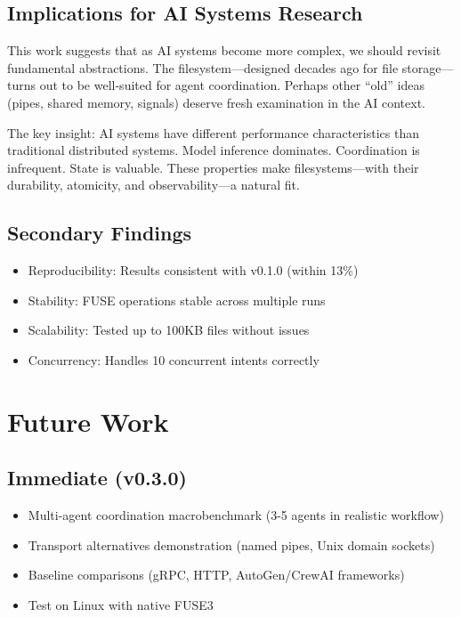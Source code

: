 \documentclass[11pt]{article}
\begin{document}
\subsection{Implications for AI Systems Research}

This work suggests that as AI systems become more complex, we should revisit fundamental abstractions. The filesystem---designed decades ago for file storage---turns out to be well-suited for agent coordination. Perhaps other ``old'' ideas (pipes, shared memory, signals) deserve fresh examination in the AI context.

The key insight: AI systems have different performance characteristics than traditional distributed systems. Model inference dominates. Coordination is infrequent. State is valuable. These properties make filesystems---with their durability, atomicity, and observability---a natural fit.

\subsection{Secondary Findings}

\begin{itemize}
\item Reproducibility: Results consistent with v0.1.0 (within 13\%)
\item Stability: FUSE operations stable across multiple runs
\item Scalability: Tested up to 100KB files without issues
\item Concurrency: Handles 10 concurrent intents correctly
\end{itemize}

\section{Future Work}

\subsection{Immediate (v0.3.0)}

\begin{itemize}
\item Multi-agent coordination macrobenchmark (3-5 agents in realistic workflow)
\item Transport alternatives demonstration (named pipes, Unix domain sockets)
\item Baseline comparisons (gRPC, HTTP, AutoGen/CrewAI frameworks)
\item Test on Linux with native FUSE3
\end{itemize}
\end{document}
